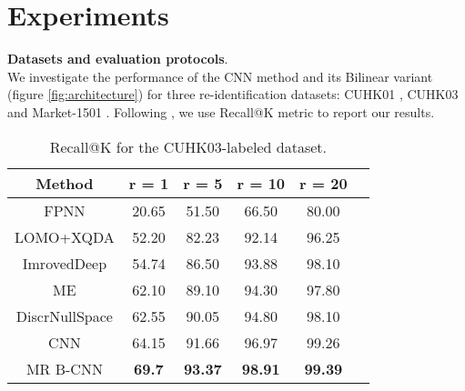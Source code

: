 \section{Experiments}




\indent\textbf{Datasets and evaluation protocols}. \\
We investigate the performance of the CNN method and its Bilinear variant (figure \ref{fig:architecture}) for three re-identification datasets: CUHK01 \citep{LiZW12}, CUHK03 \citep{Li14} and Market-1501 \citep{zheng2015scalable}. Following \citep{Li14}, we use Recall@K metric to report our results.



\begin{table}%
\begin{center}
\caption{Recall@K for the CUHK03-labeled dataset.}
\begin{tabular}{c|ccccc}

\hline
Method                & r = 1   &  r = 5   & r = 10   & r = 20 \\
\hline
FPNN \citep{Li14}  & 20.65  & 51.50    & 66.50      & 80.00   \\
LOMO+XQDA \citep{liao2015person}  & 52.20  & 82.23    & 92.14         & 96.25   \\
ImrovedDeep \citep{ahmed2015improved}& 54.74 & 86.50    & 93.88      & 98.10   \\
ME \citep{paisitkriangkrai2015learning}
                       &62.10    & 89.10    &  94.30      & 97.80  \\
DiscrNullSpace \citep{zhang2016learning}&62.55  &   90.05  & 94.80        & 98.10  \\  
\hline
 CNN                   &64.15   & 91.66    & 96.97     &99.26   \\
 MR B-CNN      & \bf{69.7}    & \bf{93.37}    &\bf{98.91}    &\bf{99.39}   \\
 \hline
\end{tabular}
\label{tab:cuhk03_labeled}
\end{center}
\end{table} 




